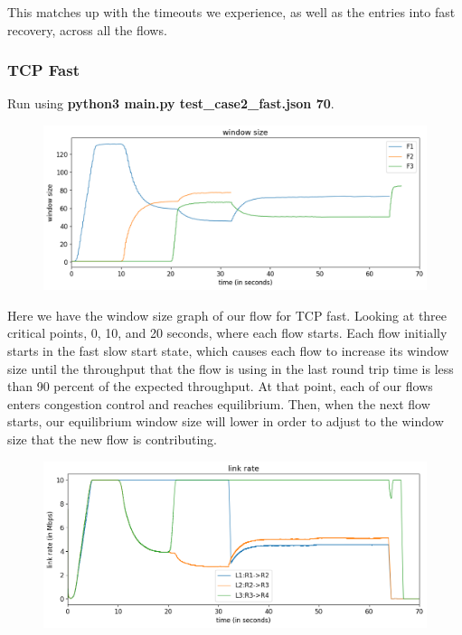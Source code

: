\documentclass{article}
\begin{document}
This matches up with the timeouts we experience, as well as the entries into fast recovery, across all the flows.

\subsubsection{TCP Fast}

Run using \textbf{python3 main.py test\_case2\_fast.json 70}.

\begin{figure}[H]
\centering
\includegraphics[width = \textwidth]{test_case2_fast window size.png}
\end{figure}

Here we have the window size graph of our flow for TCP fast. Looking at three critical points, 0, 10, and 20 seconds, where each flow starts. Each flow initially starts in the fast slow start state, which causes each flow to increase its window size until the throughput that the flow is using in the last round trip time is less than 90 percent of the expected throughput. At that point, each of our flows enters congestion control and reaches equilibrium. Then, when the next flow starts, our equilibrium window size will lower in order to adjust to the window size that the new flow is contributing.

\begin{figure}[H]
\centering
\includegraphics[width = \textwidth]{test_case2_fast link rate.png}
\end{figure}
\end{document}
